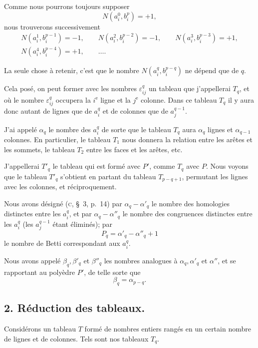 \documentclass{article}
\begin{document}
Comme nous pourrons toujours supposer
\[ N(a^{0}_{i}, b^{p}_{i}) = +1, \]
nous trouverons successivement
\[ \begin{gathered} N(a^{1}_{i}, b^{p-1}_{i}) = -1, \qquad N(a^{2}_{i}, b^{p-2}_{i}) = -1, \qquad N(a^{3}_{i}, b^{p-3}_{i}) = +1, \\ N(a^{4}_{i}, b^{p-4}_{i}) = +1, \qquad \ldots. \end{gathered} \]

La seule chose à retenir, c'est que le nombre $N(a^{q}_{i}, b^{p-q}_{i})$ ne dépend que de $q$.

Cela posé, on peut former avec les nombres $\varepsilon^{q}_{ij}$ un tableau que j'appellerai $T_{q}$, et où le nombre $\varepsilon^{q}_{ij}$ occupera la $i^{\text{e}}$ ligne et la $j^{\text{e}}$ colonne. Dans ce tableau $T_{q}$ il y aura donc autant de lignes que de $a^{q}_{i}$ et de colonnes que de $a^{q-1}_{j}$.

J'ai appelé $\alpha_{q}$ le nombre des $a^{q}_{i}$ de sorte que le tableau $T_{q}$ aura $\alpha_{q}$ lignes et $\alpha_{q-1}$ colonnes. En particulier, le tableau $T_{1}$ nous donnera la relation entre les arêtes et les sommets, le tableau $T_{2}$ entre les faces et les arêtes, etc.

J'appellerai $T'_{q}$ le tableau qui est formé avec $P'$, comme $T_{q}$ avec $P$. Nous voyons que le tableau $T'_{q}$ s'obtient en partant du tableau $T_{p-q+1}$, permutant les lignes avec les colonnes, et réciproquement.

Nous avons désigné (\textsc{c}, \S~3, p.\ 14) par $\alpha_{q} - \alpha'_{q}$ le nombre des homologies distinctes entre les $a^{q}_{i}$, et par $\alpha_{q} - \alpha''_{q}$ le nombre des congruences distinctes entre les $a^{q}_{i}$ (les $a^{q-1}_{j}$ étant éliminés); par
\[ P_{q} = \alpha'_{q} - \alpha''_{q} + 1 \]
le nombre de Betti correspondant aux $a^{q}_{i}$.

Nous avons appelé $\beta_{q}, \beta'_{q}$ et $\beta''_{q}$ les nombres analogues à $\alpha_{q}, \alpha'_{q}$ et $\alpha''$, et se rapportant au polyèdre $P'$, de telle sorte que
\[ \beta_{q} = \alpha_{p-q}. \]

\subsection*{2. Réduction des tableaux.}

Considérons un tableau $T$ formé de nombres entiers rangés en un certain nombre de lignes et de colonnes. Tels sont nos tableaux $T_{q}$.
\end{document}
